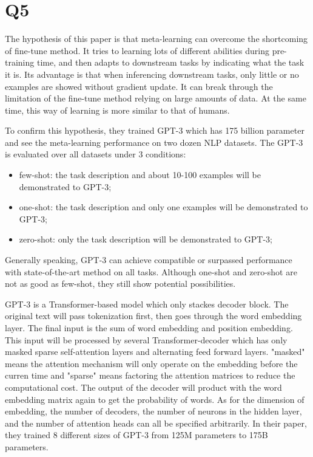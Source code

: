 \documentclass{article}
\begin{document}
\section*{Q5}
The hypothesis of this paper is that meta-learning can overcome the shortcoming of fine-tune method. It tries to learning lots of different abilities during pre-training time, and then adapts to downstream tasks by indicating what the task it is. Its advantage is that when inferencing downstream tasks, only little or no examples are showed without gradient update. It can break through the limitation of the fine-tune method relying on large amounts of data. At the same time, this way of learning is more similar to that of humans.

To confirm this hypothesis, they trained GPT-3 which has 175 billion parameter and see the meta-learning performance on two dozen NLP datasets. The GPT-3 is evaluated over all datasets under 3 conditions:
\begin{itemize}
   \item few-shot: the task description and about 10-100 examples will be demonstrated to GPT-3;
   \item one-shot: the task description and only one examples will be demonstrated to GPT-3;
   \item zero-shot: only the task description will be demonstrated to GPT-3;
\end{itemize}
Generally speaking, GPT-3 can achieve compatible or surpassed performance with state-of-the-art method on all tasks. Although one-shot and zero-shot are not as good as few-shot, they still show potential possibilities.

GPT-3 is a Transformer-based model which only stackes decoder block. The original text will pass tokenization first, then goes through the word embedding layer. The final input is the sum of word embedding and position embedding. This input will be processed by several Transformer-decoder which has only masked sparse self-attention layers and alternating feed forward layers. "masked" means the attention mechanism will only operate on the embedding before the curren time and "sparse" means factoring the attention matrices to reduce the computational cost. The output of the decoder will product with the word embedding matrix again to get the probability of words. As for the dimension of embedding, the number of decoders, the number of neurons in the hidden layer, and the number of attention heads can all be specified arbitrarily. In their paper, they trained 8 different sizes of GPT-3 from 125M parameters to 175B parameters.
\end{document}
